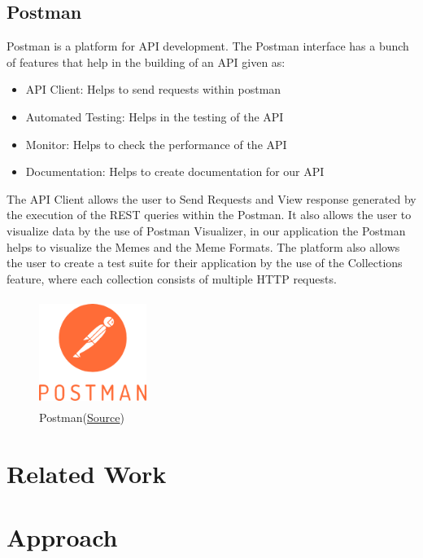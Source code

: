 \documentclass[12pt]{article}
\begin{document}
\subsection{Postman}
Postman is a platform for API development. The Postman interface has a bunch of features that help in the building of an API given as:
\begin{itemize}
    \item API Client: Helps to send requests within postman
    \item Automated Testing: Helps in the testing of the API
    \item Monitor: Helps to check the performance of the API
    \item Documentation: Helps to create documentation for our API
\end{itemize}
\begin{flushleft}
The API Client allows the user to Send Requests and View response generated by the execution of the REST queries within the Postman. It also allows the user to visualize data by the use of Postman Visualizer, in our application the Postman helps to visualize the Memes and the Meme Formats. The platform also allows the user to create a test suite for their application by the use of the Collections feature, where each collection consists of multiple HTTP requests.
\end{flushleft}
\begin{figure}
    \centering
    \includegraphics[width=3.5cm, height=3.5cm]{../report_MemeEcon/images/postman.png}
    \caption{Postman(\href{https://www.postman.com/resources/media-assets/}{Source})}
    \label{fig:Postman}
\end{figure}

\section{Related Work} %

\section{Approach} \label{sec:Approach}
\end{document}
